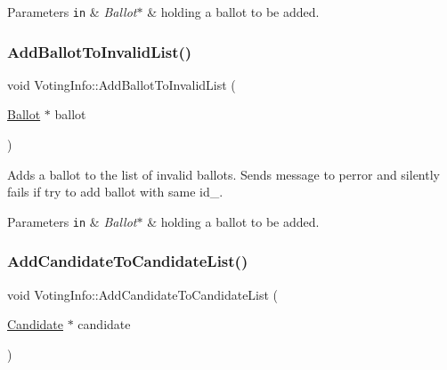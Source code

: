 \begin{DoxyParams}[1]{Parameters}
\mbox{\tt in}  & {\em Ballot$\ast$} & holding a ballot to be added. \\
\hline
\end{DoxyParams}
\mbox{\label{classVotingInfo_abeaad75b449c2dee8379d1f67768f963}} 
\subsubsection{\texorpdfstring{Add\+Ballot\+To\+Invalid\+List()}{AddBallotToInvalidList()}}
{\footnotesize\ttfamily void Voting\+Info\+::\+Add\+Ballot\+To\+Invalid\+List (\begin{DoxyParamCaption}\item[{\hyperlink{classBallot}{Ballot} $\ast$}]{ballot }\end{DoxyParamCaption})}



Adds a ballot to the list of invalid ballots. Sends message to perror and silently fails if try to add ballot with same id\+\_\+. 


\begin{DoxyParams}[1]{Parameters}
\mbox{\tt in}  & {\em Ballot$\ast$} & holding a ballot to be added. \\
\hline
\end{DoxyParams}
\mbox{\label{classVotingInfo_ac0ab5f83a06ea6721999addb43a581ea}} 
\subsubsection{\texorpdfstring{Add\+Candidate\+To\+Candidate\+List()}{AddCandidateToCandidateList()}\hspace{0.1cm}{\footnotesize\ttfamily [1/2]}}
{\footnotesize\ttfamily void Voting\+Info\+::\+Add\+Candidate\+To\+Candidate\+List (\begin{DoxyParamCaption}\item[{\hyperlink{classCandidate}{Candidate} $\ast$}]{candidate }\end{DoxyParamCaption})}



